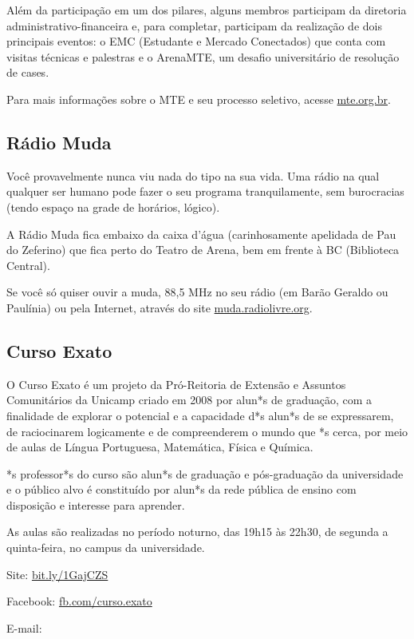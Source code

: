 Além da participação em um dos pilares, alguns membros participam da diretoria
administrativo-financeira e, para completar, participam da realização de dois
principais eventos: o EMC (Estudante e Mercado Conectados) que conta com
visitas técnicas e palestras e o ArenaMTE, um desafio universitário de
resolução de cases.

Para mais informações sobre o MTE e seu processo seletivo, acesse
\url{mte.org.br}.

\subsection{Rádio Muda}

Você provavelmente nunca viu nada do tipo na sua vida. Uma rádio na qual
qualquer ser humano pode fazer o seu programa tranquilamente, sem burocracias
(tendo espaço na grade de horários, lógico).

A Rádio Muda fica embaixo da caixa d'água (carinhosamente apelidada de Pau do
Zeferino) que fica perto do Teatro de Arena, bem em frente à BC (Biblioteca
Central).

Se você só quiser ouvir a muda, 88,5 MHz no seu rádio (em Barão Geraldo ou
Paulínia) ou pela Internet, através do site \url{muda.radiolivre.org}.

\subsection{Curso Exato}

O Curso Exato é um projeto da Pró-Reitoria de Extensão e Assuntos Comunitários
da Unicamp criado em 2008 por alun*s de graduação, com a finalidade de explorar
o potencial e a capacidade d*s alun*s de se expressarem, de raciocinarem
logicamente e de compreenderem o mundo que *s cerca, por meio de aulas de
Língua Portuguesa, Matemática, Física e Química.

*s professor*s do curso são alun*s de graduação e pós-graduação da universidade
e o público alvo é constituído por alun*s da rede pública de ensino com
disposição e interesse para aprender.

As aulas são realizadas no período noturno, das 19h15 às 22h30, de segunda a
quinta-feira, no campus da universidade.

\begin{compactitemize}
\item Site: \url{bit.ly/1GajCZS}
\item Facebook: \url{fb.com/curso.exato}
\item E-mail: 
\end{compactitemize}

